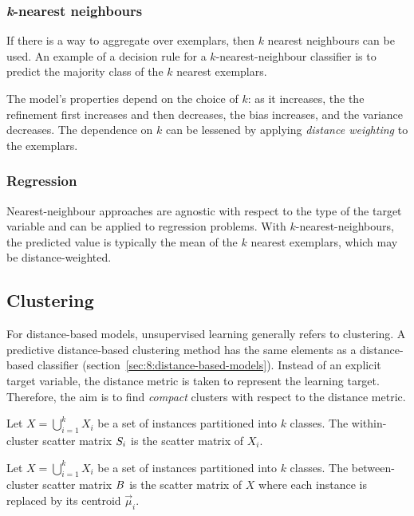 \subsubsection{\textit{k}-nearest neighbours}

If there is a way to aggregate over exemplars, then $k$ nearest neighbours can
be used.
An example of a decision rule for a $k$-nearest-neighbour classifier is to
predict the majority class of the $k$ nearest exemplars.

The model's properties depend on the choice of $k$: as it increases, the
the refinement first increases and then decreases, the bias increases, and the
variance decreases.
The dependence on $k$ can be lessened by applying \textit{distance weighting}
to the exemplars.

\subsubsection{Regression}

Nearest-neighbour approaches are agnostic with respect to the type of the target
variable and can be applied to regression problems.
With $k$-nearest-neighbours, the predicted value is typically the mean of the
$k$ nearest exemplars, which may be distance-weighted.

\subsection{Clustering}
\label{sec:8:clustering}

For distance-based models, unsupervised learning generally refers to clustering.
A predictive distance-based clustering method has the same elements as a
distance-based classifier (section~\ref{sec:8:distance-based-models}).
Instead of an explicit target variable, the distance metric is taken to
represent the learning target.
Therefore, the aim is to find \textit{compact} clusters with respect to the
distance metric.

\begin{dfn}
  Let $X = \bigcup_{i = 1}^{k} X_i$ be a set of instances partitioned into $k$ classes.
  The within-cluster scatter matrix $S_i$ is the scatter matrix of $X_i$.
\end{dfn}

\begin{dfn}
  Let $X = \bigcup_{i = 1}^{k} X_i$ be a set of instances partitioned into $k$ classes.
  The between-cluster scatter matrix $B$ is the scatter matrix of $X$
  where each instance is replaced by its centroid $\vec{\mu}_i$.
\end{dfn}

